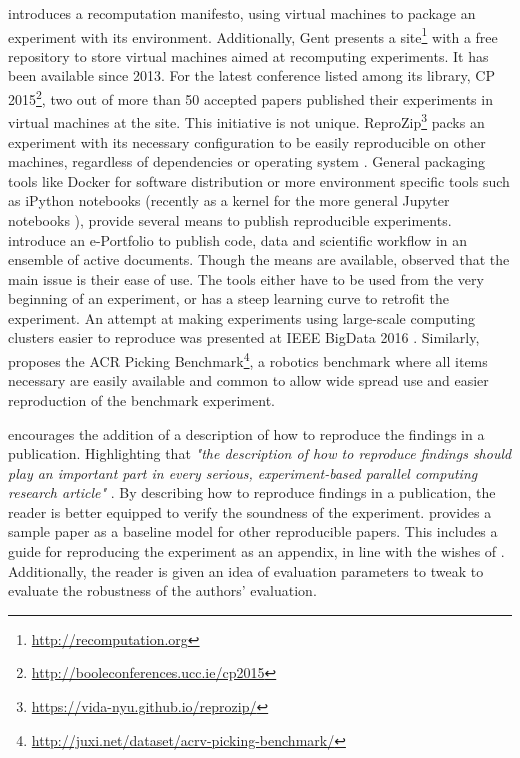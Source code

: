 \cite{gent2013recomputation} introduces a recomputation manifesto, using virtual machines to package an experiment with its environment. Additionally, Gent presents a site\footnote{\url{http://recomputation.org}} with a free repository to store virtual machines aimed at recomputing experiments. It has been available since 2013. For the latest conference listed among its library, CP 2015\footnote{\url{http://booleconferences.ucc.ie/cp2015}}, two out of more than 50 accepted papers published their experiments in virtual machines at the site. This initiative is not unique. ReproZip\footnote{\url{https://vida-nyu.github.io/reprozip/}} packs an experiment with its necessary configuration to be easily reproducible on other machines, regardless of dependencies or operating system \citep{chirigati2013reprozip}. General packaging tools like Docker \citep{boettiger2015introduction, nagler2015sustainability} for software distribution or more environment specific tools such as iPython notebooks \citep{PER-GRA:2007} (recently as a kernel for the more general Jupyter notebooks \citep{Kluyver2016}), provide several means to publish reproducible experiments. \cite{yilmaz2012Reproducibility} introduce an e-Portfolio to publish code, data and scientific workflow in an ensemble of active documents. Though the means are available, \cite{gent2014recomputation} observed that the main issue is their ease of use. The tools either have to be used from the very beginning of an experiment, or has a steep learning curve to retrofit the experiment. An attempt at making experiments using large-scale computing clusters easier to reproduce was presented at IEEE BigData 2016 \citep{Monajemi}. Similarly, \cite{leitner2016acrv} proposes the ACR Picking Benchmark\footnote{\url{http://juxi.net/dataset/acrv-picking-benchmark/}}, a robotics benchmark where all items necessary are easily available and common to allow wide spread use and easier reproduction of the benchmark experiment.

\cite{hunold2013state} encourages the addition of a description of how to reproduce the findings in a publication. Highlighting that \emph{"the description of how to reproduce findings should play an important part in every serious, experiment-based parallel computing research article"} \citep{hunold2013state}. By describing how to reproduce findings in a publication, the reader is better equipped to verify the soundness of the experiment. \cite{dolfi2014model} provides a sample paper as a baseline model for other reproducible papers. This includes a guide for reproducing the experiment as an appendix, in line with the wishes of \cite{hunold2013state}. Additionally, the reader is given an idea of evaluation parameters to tweak to evaluate the robustness of the authors' evaluation.

